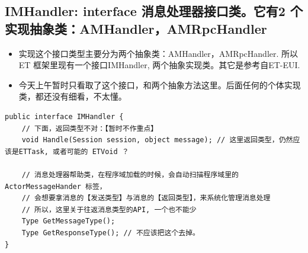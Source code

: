 \documentclass[9pt, b5paper]{article}
\begin{document}
\subsection{IMHandler: interface 消息处理器接口类。它有2 个实现抽象类：AMHandler，AMRpcHandler}
\label{sec-11-1}
\begin{itemize}
\item 实现这个接口类型主要分为两个抽象类：AMHandler，AMRpcHandler. 所以ET 框架里现有一个接口IMHandler, 两个抽象实现类。其它是参考自ET-EUI.
\item 今天上午暂时只看取了这个接口，和两个抽象方法这里。后面任何的个体实现类，都还没有细看，不太懂。
\end{itemize}
\begin{verbatim}
public interface IMHandler {
    // 下面，返回类型不对：【暂时不作重点】
    void Handle(Session session, object message); // 这里返回类型，仍然应该是ETTask, 或者可能的 ETVoid ？

    // 消息处理器帮助类，在程序域加载的时候，会自动扫描程序域里的ActorMessageHander 标签，
    // 会想要拿消息的【发送类型】与消息的【返回类型】，来系统化管理消息处理
    // 所以，这里关于往返消息类型的API, 一个也不能少
    Type GetMessageType();
    Type GetResponseType(); // 不应该把这个去掉。
}
\end{verbatim}
\end{document}

